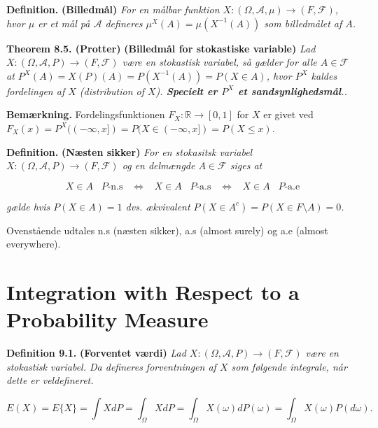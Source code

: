 \documentclass[a4paper,12pt,openany]{book}
\begin{document}
\textbf{Definition.} \textbf{(Billedmål)} \emph{For en målbar funktion \(X : (\Omega,\mathcal{A},\mu) \to (F,\mathcal{F})\), hvor \(\mu\) er et mål på \(\mathcal{A}\) defineres \(\mu^X(A)=\mu(X^{-1}(A))\) som billedmålet af \(A\).}

\textbf{Theorem 8.5. (Protter)} \textbf{(Billedmål for stokastiske variable)} \emph{Lad \(X : (\Omega,\mathcal{A},P) \to (F,\mathcal{F})\) være en stokastisk variabel, så gælder for alle \(A\in\mathcal{F}\) at \(P^X(A)=X(P)(A)=P(X^{-1}(A))=P(X\in A)\), hvor \(P^X\) kaldes fordelingen af \(X\) (distribution of \(X\)). \textbf{Specielt er \(P^X\) et sandsynlighedsmål}..}

\textbf{Bemærkning.} Fordelingsfunktionen \(F_X: \mathbb{R}\to [0,1]\) for \(X\) er givet ved \(F_X(x)=P^X((-\infty,x])=P(X\in (-\infty,x])=P(X\le x)\).

\textbf{Definition.} \textbf{(Næsten sikker)} \emph{For en stokasitsk variabel \(X:(\Omega,\mathcal{A},P) \to (F,\mathcal{F})\) og en delmængde \(A\in \mathcal{F}\) siges at}

\[
X\in A\hspace{10pt} P\text{-n.s}\hspace{10pt}\Leftrightarrow\hspace{10pt} X\in A\hspace{10pt} P\text{-a.s}\hspace{10pt}\Leftrightarrow\hspace{10pt} X\in A\hspace{10pt} P\text{-a.e}
\]

\emph{gælde hvis \(P(X\in A)=1\) dvs. ækvivalent \(P(X\in A^c)=P(X\in F\setminus A)=0\).}

Ovenstående udtales n.s (næsten sikker), a.s (almost surely) og a.e (almost everywhere).

\hypertarget{integration-with-respect-to-a-probability-measure}{%
\section{Integration with Respect to a Probability Measure}\label{integration-with-respect-to-a-probability-measure}}

\textbf{Definition 9.1.} \textbf{(Forventet værdi)} \emph{Lad \(X : (\Omega, \mathcal{A}, P) \to (F,\mathcal{F})\) være en stokastisk variabel. Da defineres forventningen af \(X\) som følgende integrale, når dette er veldefineret.}

\[
E(X)=E\{X\}=\int X dP=\int_\Omega X dP=\int_\Omega X(\omega)dP(\omega)=\int_\Omega X(\omega)P(d\omega).
\]
\end{document}
